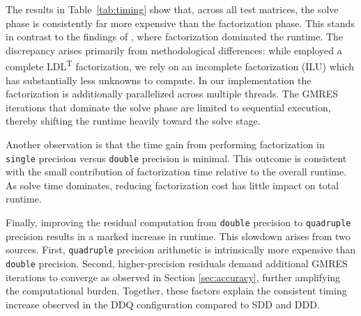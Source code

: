 The results in Table~\ref{tab:timing} show that, across all test matrices, the
solve phase is consistently far more expensive than the factorization phase.
This stands in contrast to the findings of \textcite{wong_exploring_2024}, where
factorization dominated the runtime. The discrepancy arises primarily from
methodological differences: while \citeauthor{wong_exploring_2024} employed a
complete LDL\textsuperscript{T} factorization, we rely on an incomplete
factorization (ILU) which has substantially less unknowns to compute. In our
implementation the factorization is additionally parallelized across multiple
threads. The GMRES iterations that dominate the solve phase are limited to
sequential execution, thereby shifting the runtime heavily toward the solve
stage.

Another observation is that the time gain from performing factorization in
\texttt{single} precision versus \texttt{double} precision is minimal. This
outcome is consistent with the small contribution of factorization time relative
to the overall runtime. As solve time dominates, reducing factorization cost has
little impact on total runtime.

Finally, improving the residual computation from \texttt{double} precision to
\texttt{quadruple} precision results in a marked increase in runtime. This
slowdown arises from two sources. First, \texttt{quadruple} precision arithmetic
is intrinsically more expensive than \texttt{double} precision. Second,
higher-precision residuals demand additional GMRES iterations to converge as
observed in Section \ref{sec:accuracy}, further amplifying the computational
burden. Together, these factors explain the consistent timing increase observed
in the DDQ configuration compared to SDD and DDD.
